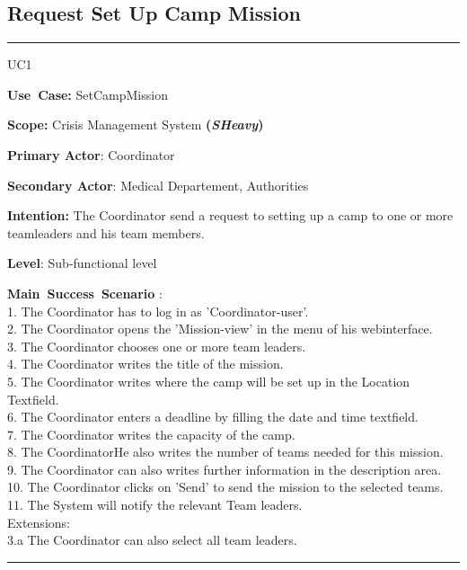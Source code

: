 \subsection{Request Set Up Camp Mission}
\vspace{0.5cm}
\hrule
\vspace{0.5cm}
\begin{lyxlist}{UC1}
\small{
\item [\textbf{Use~Case:}] SetCampMission
\item [\textbf{Scope:}] Crisis Management System \textbf{(\emph{SHeavy})}
\item [\textbf{Primary Actor}:] Coordinator
\item [\textbf{Secondary Actor}:] Medical Departement, Authorities
\item [\textbf{Intention:}]The Coordinator send a request to setting up a camp
to one or more teamleaders and his team members.
\item [\textbf{Level}:]Sub-functional level
\item [\textbf{Main~Success~Scenario}]:\\
1. The Coordinator has to log in as 'Coordinator-user'.\\
2. The Coordinator opens the 'Mission-view' in the menu of his webinterface.\\
3. The Coordinator chooses one or more team leaders.\\
4. The Coordinator writes the title of the mission.\\
5. The Coordinator writes where the camp will be set up in the Location
Textfield.\\
6. The Coordinator enters a deadline by filling the date and time textfield.\\
7. The Coordinator writes the capacity of the camp.\\
8. The CoordinatorHe also writes the number of teams needed for this mission.\\
9. The Coordinator can also writes further information in the description
area.\\
10. The Coordinator clicks on 'Send' to send the mission to the selected
teams.\\ 
11. The System will notify the relevant Team leaders.\\
Extensions:\\
	3.a The Coordinator can also select all team leaders.\\
}
\end{lyxlist}
\hrule 
\vspace{0.5cm} 

